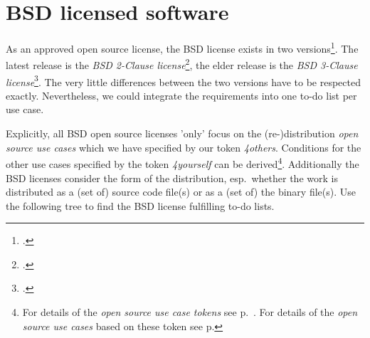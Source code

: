 %
%
%
%
%



\section{BSD licensed software}

As an approved open source license, the BSD license exists in two
versions\footcite[Following the OSI, there is another 'ancient' 
BSD license -- containing a fourth clause known as advertising clause -- which
\enquote{(\ldots) officially was rescinded by the Director of the Office of
Technology Licensing of the University of California on July 22nd, 1999}.
 Cf.][\nopage wp\ Because of that cancellation you can simply act according the
 \textit{BSD 3-Clause license} if you have to fulfill the eldest BSD
 license]{BsdLicense3Clause}. The latest release is the \textit{BSD 2-Clause
 license}\footcite[cf.][\nopage wp]{BsdLicense2Clause}, the elder release is the
 \textit{BSD 3-Clause license}\footcite[cf.][\nopage wp]{BsdLicense3Clause}.
 The very little differences between the two versions have to be respected
 exactly. Nevertheless, we could integrate the requirements into one to-do list
 per use case.

Explicitly, all BSD open source licenses 'only' focus on the (re-)distribution
\textit{open source use cases} which we have specified by our token
\textit{4others}. Conditions for the other use cases specified by the token
\textit{4yourself} can be derived\footnote{For details of the \textit{open
source use case tokens} see p.\ \pageref{OsucTokens}. For details of the
\textit{open source use cases} based on these token see p.
\pageref{OsucDefinitionTree} }. Additionally the BSD licenses consider the form
of the distribution, esp.\ whether the work is distributed as a (set of) source
code file(s) or as a (set of) the binary file(s). Use the following tree to find
the BSD license fulfilling to-do lists.

